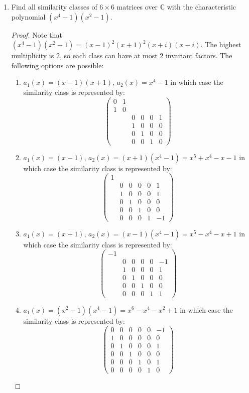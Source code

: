\documentclass{report}
\newcommand{\C}{\mathbb{C}}
\DeclareMathOperator{\tr}{tr}
\begin{document}
\begin{enumerate}
\begin{proof}
			Moreover, since $c_A(x)=\prod_{i\leq k}\alpha_i(x)$, we have that the $n-1^{th}$ coefficient of $c_A(x)$ is given by $\sum_{i\leq k}a_{i,n-1}=\tr A$.
			Eigenvalues are the roots of the characteristic polynomial $c_A$, so it is clear that their sum is the $n-1^{th}$ coefficient and their product the $0^{th}$.
		\end{proof}
		\setcounter{enumi}{10}
	\item Find all similarity classes of $6\times 6$ matrices over $\C$ with the characteristic polynomial $(x^4-1)(x^2-1)$.
		\begin{proof}
			Note that $(x^4-1)(x^2-1)=(x-1)^2(x+1)^2(x+i)(x-i)$.
			The highest multiplicity is $2$, so each class can have at most $2$ invariant factors. The following options are possible:
			\begin{enumerate} [label=(\roman*)]
				\item $a_1(x)=(x-1)(x+1)$, $a_2(x)=x^4-1$ in which case the similarity class is represented by:
					$$\begin{pmatrix}0&1\\1&0\\&&0&0&0&1\\&&1&0&0&0\\&&0&1&0&0\\&&0&0&1&0 \end{pmatrix}$$
				\item $a_1(x)=(x-1)$, $a_2(x)=(x+1)(x^4-1)=x^5+x^4-x-1$ in which case the similarity class is represented by:
					$$\begin{pmatrix}1\\&0&0&0&0&1\\&1&0&0&0&1\\&0&1&0&0&0\\&0&0&1&0&0\\&0&0&0&1&-1 \end{pmatrix}$$	
				\item $a_1(x)=(x+1)$, $a_2(x)=(x-1)(x^4-1)=x^5-x^4-x+1$ in which case the similarity class is represented by:
					$$\begin{pmatrix}-1\\&0&0&0&0&-1\\&1&0&0&0&1\\&0&1&0&0&0\\&0&0&1&0&0\\&0&0&0&1&1 \end{pmatrix}$$
				\item $a_1(x)=(x^2-1)(x^4-1)=x^6-x^4-x^2+1$ in which case the similarity class is represented by:
					$$\begin{pmatrix}0&0&0&0&0&-1\\1&0&0&0&0&0\\0&1&0&0&0&1\\0&0&1&0&0&0\\0&0&0&1&0&1\\0&0&0&0&1&0 \end{pmatrix}$$


\end{enumerate}
\end{proof}
\end{enumerate}
\end{document}
